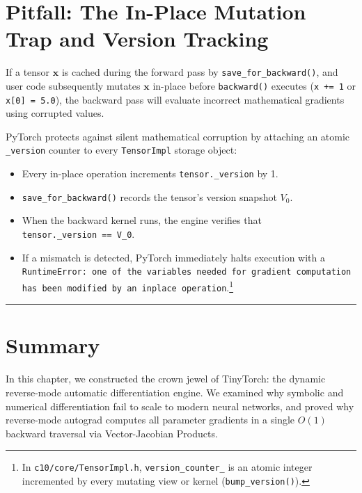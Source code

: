 \documentclass[
  letterpaper,
]{scrbook}
\providecommand{\tightlist}{%
  \setlength{\itemsep}{0pt}\setlength{\parskip}{0pt}}
\begin{document}
\section{Pitfall: The In-Place Mutation Trap and Version
Tracking}\label{pitfall-the-in-place-mutation-trap-and-version-tracking}

If a tensor \(\mathbf{x}\) is cached during the forward pass by
\texttt{save\_for\_backward()}, and user code subsequently mutates
\(\mathbf{x}\) in-place before \texttt{backward()} executes
(\texttt{x\ +=\ 1} or \texttt{x{[}0{]}\ =\ 5.0}), the backward pass will
evaluate incorrect mathematical gradients using corrupted values.

PyTorch protects against silent mathematical corruption by attaching an
atomic \texttt{\_version} counter to every \texttt{TensorImpl} storage
object:

\begin{itemize}
\tightlist
\item
  Every in-place operation increments \texttt{tensor.\_version} by 1.
\item
  \texttt{save\_for\_backward()} records the tensor's version snapshot
  \(V_0\).
\item
  When the backward kernel runs, the engine verifies that
  \texttt{tensor.\_version\ ==\ V\_0}.
\item
  If a mismatch is detected, PyTorch immediately halts execution with a
  \texttt{RuntimeError:\ one\ of\ the\ variables\ needed\ for\ gradient\ computation\ has\ been\ modified\ by\ an\ inplace\ operation}.\footnote{In
    \texttt{c10/core/TensorImpl.h}, \texttt{version\_counter\_} is an
    atomic integer incremented by every mutating view or kernel
    (\texttt{bump\_version()}).}
\end{itemize}

\begin{center}\rule{0.5\linewidth}{0.5pt}\end{center}

\section{Summary}\label{summary-6}

In this chapter, we constructed the crown jewel of TinyTorch: the
dynamic reverse-mode automatic differentiation engine. We examined why
symbolic and numerical differentiation fail to scale to modern neural
networks, and proved why reverse-mode autograd computes all parameter
gradients in a single \(O(1)\) backward traversal via Vector-Jacobian
Products.
\end{document}

